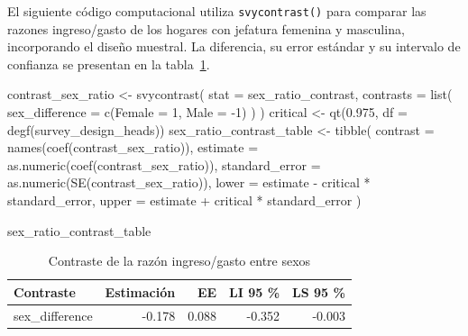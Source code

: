 \documentclass[
  spanish,
  11pt,
  letterpaper,
  oneside,
  open=any]{scrbook}
\newenvironment{Shaded}{\begin{snugshade}}{\end{snugshade}}
\newcommand{\AttributeTok}[1]{\textcolor[rgb]{0.40,0.45,0.13}{#1}}
\newcommand{\DecValTok}[1]{\textcolor[rgb]{0.68,0.00,0.00}{#1}}
\newcommand{\FloatTok}[1]{\textcolor[rgb]{0.68,0.00,0.00}{#1}}
\newcommand{\FunctionTok}[1]{\textcolor[rgb]{0.28,0.35,0.67}{#1}}
\newcommand{\NormalTok}[1]{\textcolor[rgb]{0.00,0.23,0.31}{#1}}
\newcommand{\OtherTok}[1]{\textcolor[rgb]{0.00,0.23,0.31}{#1}}
\newcommand{\SpecialCharTok}[1]{\textcolor[rgb]{0.37,0.37,0.37}{#1}}
\begin{document}
El siguiente código computacional utiliza \texttt{svycontrast()} para
comparar las razones ingreso/gasto de los hogares con jefatura femenina
y masculina, incorporando el diseño muestral. La diferencia, su error
estándar y su intervalo de confianza se presentan en la
tabla~\ref{tbl-contraste-razon-sexo}.

\begin{Shaded}
\begin{Highlighting}[]
\NormalTok{contrast\_sex\_ratio }\OtherTok{\textless{}{-}} \FunctionTok{svycontrast}\NormalTok{(}
  \AttributeTok{stat =}\NormalTok{ sex\_ratio\_contrast,}
  \AttributeTok{contrasts =} \FunctionTok{list}\NormalTok{(}
    \AttributeTok{sex\_difference =} \FunctionTok{c}\NormalTok{(}\AttributeTok{Female =} \DecValTok{1}\NormalTok{, }\AttributeTok{Male =} \SpecialCharTok{{-}}\DecValTok{1}\NormalTok{)}
\NormalTok{  )}
\NormalTok{)}
\NormalTok{critical }\OtherTok{\textless{}{-}} \FunctionTok{qt}\NormalTok{(}\FloatTok{0.975}\NormalTok{, }\AttributeTok{df =} \FunctionTok{degf}\NormalTok{(survey\_design\_heads))}
\NormalTok{sex\_ratio\_contrast\_table }\OtherTok{\textless{}{-}} \FunctionTok{tibble}\NormalTok{(}
  \AttributeTok{contrast =} \FunctionTok{names}\NormalTok{(}\FunctionTok{coef}\NormalTok{(contrast\_sex\_ratio)),}
  \AttributeTok{estimate =} \FunctionTok{as.numeric}\NormalTok{(}\FunctionTok{coef}\NormalTok{(contrast\_sex\_ratio)),}
  \AttributeTok{standard\_error =} \FunctionTok{as.numeric}\NormalTok{(}\FunctionTok{SE}\NormalTok{(contrast\_sex\_ratio)),}
  \AttributeTok{lower =}\NormalTok{ estimate }\SpecialCharTok{{-}}\NormalTok{ critical }\SpecialCharTok{*}\NormalTok{ standard\_error,}
  \AttributeTok{upper =}\NormalTok{ estimate }\SpecialCharTok{+}\NormalTok{ critical }\SpecialCharTok{*}\NormalTok{ standard\_error}
\NormalTok{)}

\NormalTok{sex\_ratio\_contrast\_table}
\end{Highlighting}
\end{Shaded}

{

\begin{longtable}[]{@{}lrrrr@{}}

\caption{\label{tbl-contraste-razon-sexo}Contraste de la razón
ingreso/gasto entre sexos}

\tabularnewline

\toprule\noalign{}
Contraste & Estimación & EE & LI 95 \% & LS 95 \% \\
\midrule\noalign{}
\endhead
\bottomrule\noalign{}
\endlastfoot
sex\_difference & -0.178 & 0.088 & -0.352 & -0.003 \\

\end{longtable}

}
\end{document}
